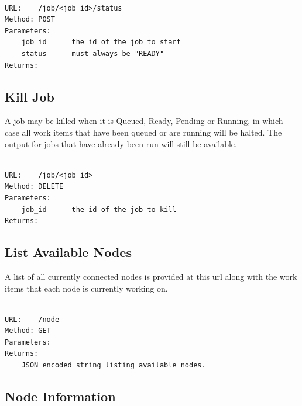 \begin{adjustwidth}{2.5em}{2.5em}
\begin{verbatim}

URL:    /job/<job_id>/status
Method: POST
Parameters: 
    job_id      the id of the job to start
    status      must always be "READY"
Returns:

\end{verbatim}
\end{adjustwidth}

\subsection{Kill Job}
\label{killjob}

A job may be killed when it is Queued, Ready, Pending or Running, in which case all work items that have been queued or are running will be halted. The output for jobs that have already been run will still be available.

\begin{adjustwidth}{2.5em}{2.5em}
\begin{verbatim}

URL:    /job/<job_id>
Method: DELETE
Parameters: 
    job_id      the id of the job to kill
Returns:

\end{verbatim}
\end{adjustwidth}

\subsection{List Available Nodes}
\label{listavailablenodes}

A list of all currently connected nodes is provided at this url along with the work items that each node is currently working on.

\begin{adjustwidth}{2.5em}{2.5em}
\begin{verbatim}

URL:    /node
Method: GET
Parameters:
Returns:    
    JSON encoded string listing available nodes.

\end{verbatim}
\end{adjustwidth}

\subsection{Node Information}
\label{nodeinformation}

